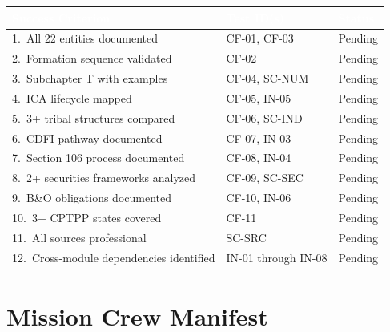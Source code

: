 \documentclass[11pt,letterpaper]{article}
\newcommand{\tableheader}[1]{\textbf{\sffamily\textcolor{white}{#1}}}
\begin{document}
\begin{center}
\begin{tabularx}{\textwidth}{XL{3.5cm}C{1.5cm}}
\toprule
{}
\tableheader{Success Criterion} & \tableheader{Test ID(s)} & \tableheader{Status} \\
.\ All 22 entities documented & CF-01, CF-03 & Pending \\
2.\ Formation sequence validated & CF-02 & Pending \\
3.\ Subchapter T with examples & CF-04, SC-NUM & Pending \\
4.\ ICA lifecycle mapped & CF-05, IN-05 & Pending \\
5.\ 3+ tribal structures compared & CF-06, SC-IND & Pending \\
6.\ CDFI pathway documented & CF-07, IN-03 & Pending \\
7.\ Section 106 process documented & CF-08, IN-04 & Pending \\
8.\ 2+ securities frameworks analyzed & CF-09, SC-SEC & Pending \\
9.\ B\&O obligations documented & CF-10, IN-06 & Pending \\
10.\ 3+ CPTPP states covered & CF-11 & Pending \\
11.\ All sources professional & SC-SRC & Pending \\
12.\ Cross-module dependencies identified & IN-01 through IN-08 & Pending \\
\bottomrule
\end{tabularx}
\end{center}

\section{Mission Crew Manifest}
\end{document}
